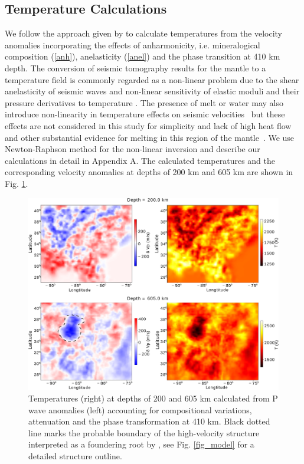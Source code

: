 \documentclass[draft,linenumbers]{agujournal2018}
\begin{document}
\subsection{Temperature Calculations} \label{temp_var}
    We follow the approach given by \citet{Cammarano2003} to calculate temperatures from the velocity anomalies incorporating the effects of anharmonicity, i.e. mineralogical composition (\ref{anh}), anelasticity (\ref{anel}) and the phase transition at 410 km depth. The conversion of seismic tomography results for the mantle to a temperature field is commonly regarded as a non-linear problem due to the shear anelasticity of seismic waves \citep{minster1981model, karato1993importance, sobolev1996upper, Goes_2000, artemieva2004shear} and non-linear sensitivity of elastic moduli and their pressure derivatives to temperature \citep{duffy1989seismic, anderson1992high, Cammarano2003, stixrude2005thermodynamics}. The presence of melt or water may also introduce non-linearity in temperature effects on seismic velocities~\citep{Karato_1998} but these effects are not considered in this study for simplicity and lack of high heat flow and other substantial evidence for melting in this region of the  mantle~\citep{blackwell2006assessment}. We use Newton-Raphson method for the non-linear inversion and describe our calculations in detail in Appendix A. The calculated temperatures and the corresponding velocity anomalies at depths of 200 km and 605 km are shown in Fig. \ref{fig_temp}.
%
\begin{figure}[ht]
    \centering
    \includegraphics[width=0.75\linewidth]{figures/figure_temp.png}
    \caption{Temperatures (right) at depths of 200 and 605 km calculated from P wave anomalies (left) accounting for compositional variations, attenuation and the phase transformation at 410 km. Black dotted line marks the probable boundary of the high-velocity structure interpreted as a foundering root by \citet{Biryol_2016}, see Fig. \ref{fig_model} for a detailed structure outline.}
    \label{fig_temp}
 \end{figure}
\end{document}
